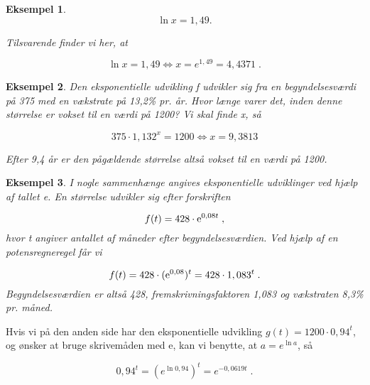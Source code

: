 \documentclass[12pt,oneside,a4paper]{article}
\theoremstyle{plain}
\newtheorem*{eks}{Eksempel}
\begin{document}
\begin{eks}
\[
\ln x = 1,49.
\]

Tilsvarende finder vi her, at

\[
\ln x = 1,49 \iff x = e^{1,49} = 4,4371 \; .
\]
\end{eks}


\begin{eks}
Den eksponentielle udvikling f udvikler sig fra en begyndelsesværdi på 375 med
en vækstrate på 13,2\% pr. år. Hvor længe varer det, inden denne størrelse er
vokset til en værdi på 1200? Vi skal finde x, så

\[
375 \cdot 1,132^x = 1200 \iff x = 9,3813
\]

Efter 9,4 år er den pågældende størrelse altså vokset til en værdi på 1200.
\end{eks}


\begin{eks}

    I nogle sammenhænge angives eksponentielle udviklinger ved hjælp af tallet {\rm e}.
En størrelse udvikler sig efter forskriften

\[
    f(t) = 428 \cdot {\rm e}^{0,08t} \; ,
\]
hvor t angiver antallet af måneder efter begyndelsesværdien. Ved hjælp af en
potensregneregel får vi

\[
    f(t) = 428 \cdot ({\rm e}^{0,08})^t = 428 \cdot 1,083^t \; .
\]
Begyndelsesværdien er altså 428, fremskrivningsfaktoren 1,083 og vækstraten
8,3\% pr. måned.
\end{eks}

Hvis vi på den anden side har den eksponentielle udvikling $g(t) = 1200 \cdot 0,94^t$,
og ønsker at bruge skrivemåden med e, kan vi benytte, at  $a = e^{\ln a}$, så 

\[
0,94^t = (e^{\ln 0,94})^t = e^{-0,0619t} \; .
\]
\end{document}
